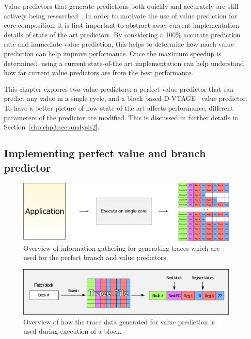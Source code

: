 Value predictors that generate predictions both quickly and accurately are still actively being researched~\cite{peraisVTAGE2014,peraisBeBop2015,sheikh2017value}.
In order to motivate the use of value prediction for core composition, it is first important to abstract away current implementation details of state of the art predictors.
By considering a 100\% accurate prediction rate and immediate value prediction, this helps to determine how much value prediction can help improve performance.
Once the maximum speedup is determined, using a current state-of-the art implementation can help understand how far current value predictors are from the best performance.

This chapter explores two value predictors: a perfect value predictor that can predict any value in a single cycle, and a block based D-VTAGE~\cite{peraisBeBop2015} value predictor.
To have a better picture of how state-of-the art affects performance, different parameters of the predictor are modified.
This is discussed in further details in Section~\ref{chp:chp3:sec:analysis2}.

\subsection{Implementing perfect value and branch predictor}

\begin{figure}[t]
    \centering
    \includegraphics[width=1\textwidth]{chapter3/graphics/trace-gen.pdf}

    \caption{Overview of information gathering for generating traces which are used for the perfect branch and value predictors.}
    \label{fig:trace-gen}
\end{figure}

\begin{figure}[t]
    \centering
    \includegraphics[width=1\textwidth]{chapter3/graphics/fetching-trace.pdf}

    \caption{Overview of how the trace data generated for value prediction is used during execution of a block.}
    \label{fig:trace-used}
\end{figure}

